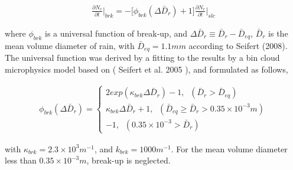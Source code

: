 \begin{eqnarray}
\frac{\partial N_{r}}{\partial t}\Bigr|_{brk}=-\bigl[\phi_{brk}(\Delta \bar{D}_{r})+1\bigr]\frac{\partial N_{r}}{\partial t}\Bigr|_{slc}\label{sn154}
\end{eqnarray}

where $\phi_{brk}$ is a universal function of break-up, and $\Delta \bar{D}_{r}\equiv \bar{D}_{r}-\bar{D}_{eq}$, $\bar{D}_{r}$ is the mean volume diameter of rain, with $\bar{D}_{eq} = 1.1 mm$ according to Seifert (2008). The universal function was derived by a fitting to the results by a bin cloud microphysics model based on ( Seifert et al. 2005 ), and formulated as follows,

\begin{eqnarray}
\phi_{brk}(\Delta\bar{D}_{r})=
\left\{
\begin{array}{l}
2exp(\kappa_{brk}\Delta\bar{D}_{r})-1,\;\;(\bar{D}_{r}>\bar{D}_{eq}) \\
\kappa_{brk}\Delta\bar{D}_{r}+1,\;\;(\bar{D}_{eq}\geq \bar{D}_{r}>0.35\times 10^{-3}m) \\
-1,\;\;(0.35\times10^{-3}>\bar{D}_{r})
\label{sn155}
\end{array}
\right.
\end{eqnarray}

with $\kappa_{brk} = 2.3 \times 10^{3} m^{-1}$, and $k_{brk} = 1000 m^{-1}$. For the mean volume diameter less than $0.35 \times 10^{-3}m$, break-up is neglected.

